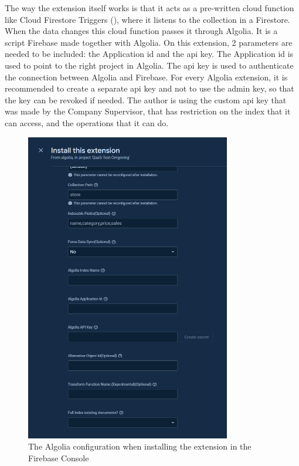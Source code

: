 \begin{multicols}{2}
      The way the extension itself works is that it acts as a pre-written cloud function like Cloud Firestore Triggers (\textit{\cite{cloudTriggers}}),
      where it listens to the collection in a Firestore. When the data changes this cloud function passes it through Algolia. It is a script Firebase made
      together with Algolia. On this extension, 2 parameters are needed to be included: the Application \acrshort{id} and the \acrshort{api} key. The Application
      \acrshort{id} is used to point to the right project in Algolia. The \acrshort{api} key is used to authenticate the connection between Algolia and Firebase.
      For every Algolia extension, it is recommended to create a separate \acrshort{api} key and not to use the admin key, so that the key can be revoked if needed.
      The author is using the custom \acrshort{api} key that was made by the Company Supervisor, that has restriction on the index that it can access, and the
      operations that it can do.
\end{multicols}

\begin{figure}[htbp]
      \centering
      \includegraphics[width=0.8\textwidth]{Figures/Firebase Algolia Extension.png}
      \caption{The Algolia configuration when installing the extension in the Firebase Console}
\end{figure}

